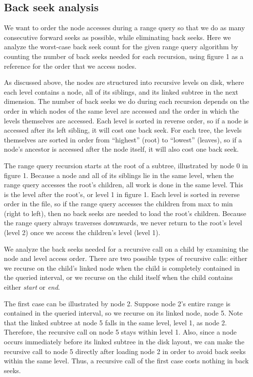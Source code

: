 \documentclass[11pt, oneside]{article}
\newcommand{\ms}{\textit}
\begin{document}
\subsection{Back seek analysis}

We want to order the node accesses during a range query so that we do as many
consecutive forward seeks as possible, while eliminating back seeks. Here we
analyze the worst-case back seek count for the given range query algorithm by
counting the number of back seeks needed for each recursion, using figure 1 as a
reference for the order that we access nodes. 

As discussed above, the nodes are structured into recursive levels on disk,
where each level contains a node, all of its siblings, and its linked subtree
in the next dimension. The number of back seeks we do during each recursion
depends on the order in which nodes of the same level are accessed and the
order in which the levels themselves are accessed. Each level is sorted in
reverse order, so if a node is accessed after its left sibling, it will cost
one back seek. For each tree, the levels themselves are sorted in order from
``highest'' (root) to ``lowest'' (leaves), so if a node's ancestor is accessed
after the node itself, it will also cost one back seek. 

The range query recursion starts at the root of a subtree, illustrated by node
0 in figure 1. Because a node and all of its siblings lie in the same level,
when the range query accesses the root's children, all work is done in the same
level. This is the level after the root's, or level 1 in figure 1. Each level
is sorted in reverse order in the file, so if the range query accesses the
children from max to min (right to left), then no back seeks are needed to load
the root's children. Because the range query always traverses downwards, we
never return to the root's level (level 2) once we access the children's level
(level 1). 

We analyze the back seeks needed for a recursive call on a child by examining
the node and level access order. There are two possible types of recursive
calls: either we recurse on the child's linked node when the child is
completely contained in the queried interval, or we recurse on the child itself
when the child contains either \ms{start} or \ms{end}.

The first case can be illustrated by node 2. Suppose node 2's entire range is
contained in the queried interval, so we recurse on its linked node, node 5.
Note that the linked subtree at node 5 falls in the same level, level 1, as
node 2.  Therefore, the recursive call on node 5 stays within level 1. Also,
since a node occurs immediately before its linked subtree in the disk layout,
we can make the recursive call to node 5 directly after loading node 2 in order
to avoid back seeks within the same level. Thus, a recursive call of the first
case costs nothing in back seeks.
\end{document}
